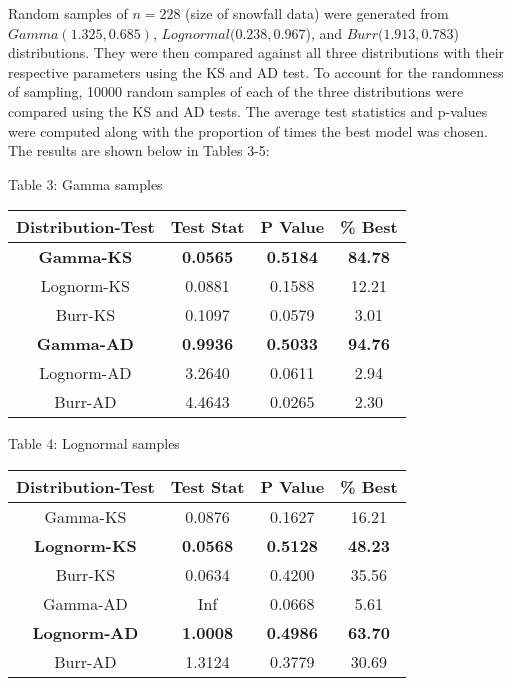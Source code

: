 \documentclass[letterpaper,12pt]{article}
\begin{document}
Random samples of $n=228$ (size of snowfall data) were generated from $Gamma(1.325, 0.685)$, $Lognormal(0.238,0.967$), and $Burr(1.913,0.783$) distributions. They were then compared against all three distributions with their respective parameters using the KS and AD test. To account for the randomness of sampling, 10000 random samples of each of the three distributions were compared using the KS and AD tests. The average test statistics and p-values were computed along with the proportion of times the best model was chosen. The results are shown below in Tables 3-5:

\begin{table}[H]
Table 3: Gamma samples \\
\begin{tabular}{|c|c|c|c|}
\hline
Distribution-Test & Test Stat       & P Value         & \% Best        \\\hline
\textbf{Gamma-KS} & \textbf{0.0565} & \textbf{0.5184} & \textbf{84.78} \\
Lognorm-KS        & 0.0881          & 0.1588          & 12.21          \\
Burr-KS           & 0.1097          & 0.0579          & 3.01           \\\hline
\textbf{Gamma-AD} & \textbf{0.9936} & \textbf{0.5033} & \textbf{94.76} \\
Lognorm-AD        & 3.2640          & 0.0611          & 2.94           \\
Burr-AD           & 4.4643          & 0.0265          & 2.30 \\\hline      
\end{tabular}
\end{table}

\begin{table}[H]
Table 4: Lognormal samples \\
\begin{tabular}{|c|c|c|c|} \hline
Distribution-Test       & Test Stat       & P Value         & \% Best        \\\hline
Gamma-KS            & 0.0876          & 0.1627          & 16.21          \\
\textbf{Lognorm-KS} & \textbf{0.0568} & \textbf{0.5128} & \textbf{48.23} \\
Burr-KS             & 0.0634          & 0.4200          & 35.56          \\\hline
Gamma-AD            & Inf             & 0.0668          & 5.61           \\
\textbf{Lognorm-AD} & \textbf{1.0008} & \textbf{0.4986} & \textbf{63.70} \\
Burr-AD             & 1.3124          & 0.3779          & 30.69  \\\hline     
\end{tabular}
\end{table}
\end{document}
